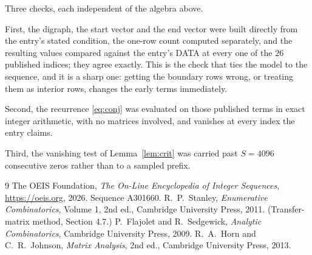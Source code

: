 \documentclass[11pt,a4paper]{article}
\theoremstyle{plain}
\theoremstyle{definition}
\begin{document}
Three checks, each independent of the algebra above.

First, the digraph, the start vector and the end vector were built directly from the
entry's stated condition, the one-row count computed separately, and the resulting values
compared against the entry's DATA at every one of the $26$ published indices; they
agree exactly. This is the check that ties the model to the sequence, and it is a sharp one:
getting the boundary rows wrong, or treating them as interior rows, changes the early terms
immediately.

Second, the recurrence \eqref{eq:conj} was evaluated on those published terms in exact
integer arithmetic, with no matrices involved, and vanishes at every index the entry claims.

Third, the vanishing test of Lemma~\ref{lem:crit} was carried past $S=4096$ consecutive
zeros rather than to a sampled prefix.

\begin{thebibliography}{9}
 The OEIS Foundation, \emph{The On-Line Encyclopedia of Integer
Sequences}, \url{https://oeis.org}, 2026. Sequence A301660.
 R.~P.~Stanley, \emph{Enumerative Combinatorics}, Volume 1, 2nd ed.,
Cambridge University Press, 2011. (Transfer-matrix method, Section 4.7.)
 P.~Flajolet and R.~Sedgewick, \emph{Analytic Combinatorics}, Cambridge
University Press, 2009.
 R.~A.~Horn and C.~R.~Johnson, \emph{Matrix Analysis}, 2nd ed., Cambridge
University Press, 2013.
\end{thebibliography}
\end{document}
